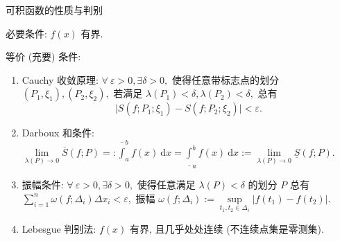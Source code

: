 \begin{frame}{可积函数的性质与判别}

必要条件: $f(x)$ 有界.

\pause
\vspace{1em}

等价 (充要) 条件:
\pause
\begin{enumerate}[<+->]
\item Cauchy 收敛原理: $\forall~\varepsilon > 0, \exists \delta > 0,$ 使得任意带标志点的划分 $(P_1, \xi_1), (P_2, \xi_2),$ 若满足 $\lambda(P_1) < \delta, \lambda(P_2) < \delta,$ 总有
\[\lvert S(f; P_1; \xi_1) - S(f; P_2; \xi_2) \rvert < \varepsilon.\]
\item Darboux 和条件: $\lim\limits_{\lambda(P) \to 0} \overline{S}(f; P) =: \overline{\int}_a^b f(x) ~ \mathrm{d} x = \underline{\int}_a^b f(x) ~ \mathrm{d} x := \lim\limits_{\lambda(P) \to 0} \underline{S}(f; P).$
\item 振幅条件: $\forall~\varepsilon > 0, \exists \delta > 0,$ 使得任意满足 $\lambda(P) < \delta$ 的划分 $P$ 总有
$\sum\limits_{i=1}^n \omega(f; \Delta_i) \Delta x_i < \varepsilon,$ 振幅 $\omega(f; \Delta_i) := \sup\limits_{t_1, t_2 \in \Delta_i} \lvert f(t_1) - f(t_2) \rvert.$
\item Lebesgue 判别法: $f(x)$ 有界, 且几乎处处连续 (不连续点集是零测集).
\end{enumerate}

\end{frame}


